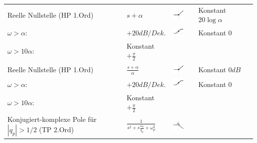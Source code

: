 \begin{landscape}
\begin{longtable}{|p{5cm}|l|ll|ll|}
		Reelle Nullstelle (HP 1.Ord) &
		$s + \alpha$ & 
		\parbox[c][1cm]{1cm}{\includegraphics[width=1cm]{./images/bode-approx-ampl-5.png}} &
		\begin{tabular}{ll}
			$\omega < \alpha$: & Konstant $20 \log \alpha$ \\
			$\omega > \alpha$: & $+20dB/Dek.$
		\end{tabular} & 
		\parbox[c][1cm]{1cm}{\includegraphics[width=1cm]{./images/bode-approx-phase-5.png}}	&
		\begin{tabular}{ll}
			$\omega < \frac{\alpha}{10}$: & Konstant $0$ \\
			$\omega > 10 \alpha$: & Konstant $+\frac{\pi}{2}$
		\end{tabular}
		\\ \hline	
		Reelle Nullstelle (HP 1.Ord) &
		$\frac{s + \alpha}{\alpha}$ &
		\parbox[c][1cm]{1cm}{\includegraphics[width=1cm]{./images/bode-approx-ampl-5.png}} &
		\begin{tabular}{ll}
			$\omega < \alpha$: & Konstant $0dB$ \\
			$\omega > \alpha$: & $+20dB/Dek.$
		\end{tabular} &
		\parbox[c][1cm]{1cm}{\includegraphics[width=1cm]{./images/bode-approx-phase-5.png}} &
		\begin{tabular}{ll}
			$\omega < \frac{\alpha}{10}$: & Konstant $0$ \\
			$\omega > 10 \alpha$: & Konstant $+\frac{\pi}{2}$
		\end{tabular}
		\\ \hline
		Konjugiert-komplexe Pole \newline
		für $|q_p| > 1/2$ (TP 2.Ord) &
		$\frac{1}{s^2+s\frac{\omega_p}{q_p}+\omega_p^2}$ &
		\parbox[c][1cm]{1cm}{\includegraphics[width=1cm]{./images/bode-approx-ampl-6.png}} &

\end{longtable}
\end{landscape}
